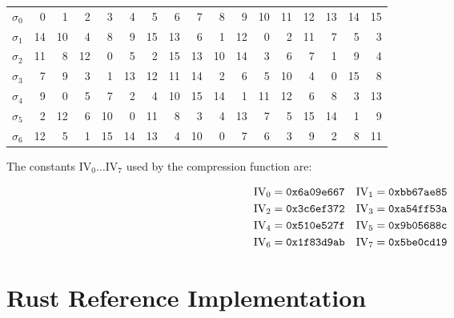 \documentclass[11pt,notitlepage,a4paper]{article}
\newcommand{\IV}{\text{IV}}
\begin{document}
\begin{appendices}
\begin{center}
\begin{tabular}{ | r | r r r r r r r r r r r r r r r r | }
    \hline
    $\sigma_0$ & 0 & 1 & 2 & 3 & 4 & 5 & 6 & 7 & 8 & 9 & 10 & 11 & 12 & 13 & 14 & 15 \\
    $\sigma_1$ & 14 & 10 & 4 & 8 & 9 & 15 & 13 & 6 & 1 & 12 & 0 & 2 & 11 & 7 & 5 & 3 \\
    $\sigma_2$ & 11 & 8 & 12 & 0 & 5 & 2 & 15 & 13 & 10 & 14 & 3 & 6 & 7 & 1 & 9 & 4 \\
    $\sigma_3$ & 7 & 9 & 3 & 1 & 13 & 12 & 11 & 14 & 2 & 6 & 5 & 10 & 4 & 0 & 15 & 8 \\
    $\sigma_4$ & 9 & 0 & 5 & 7 & 2 & 4 & 10 & 15 & 14 & 1 & 11 & 12 & 6 & 8 & 3 & 13 \\
    $\sigma_5$ & 2 & 12 & 6 & 10 & 0 & 11 & 8 & 3 & 4 & 13 & 7 & 5 & 15 & 14 & 1 & 9 \\
    $\sigma_6$ & 12 & 5 & 1 & 15 & 14 & 13 & 4 & 10 & 0 & 7 & 6 & 3 & 9 & 2 & 8 & 11 \\
    \hline
\end{tabular}
\end{center}

The constants $\IV_0 \ldots \IV_7$ used by the compression function are:

\begin{align*}
    \IV_0 &= \text{\texttt{0x6a09e667}} &
    \IV_1 &= \text{\texttt{0xbb67ae85}} \\
    \IV_2 &= \text{\texttt{0x3c6ef372}} &
    \IV_3 &= \text{\texttt{0xa54ff53a}} \\
    \IV_4 &= \text{\texttt{0x510e527f}} &
    \IV_5 &= \text{\texttt{0x9b05688c}} \\
    \IV_6 &= \text{\texttt{0x1f83d9ab}} &
    \IV_7 &= \text{\texttt{0x5be0cd19}}
\end{align*}

\section{Rust Reference Implementation}\label{sec:referenceimpl}

\inputminted{rust}{reference_impl.rs}

\end{appendices}
\end{document}
